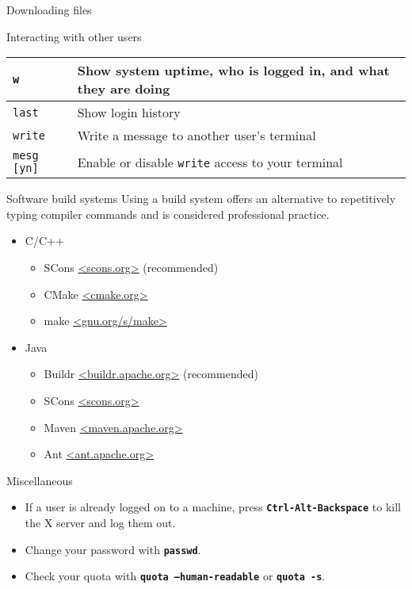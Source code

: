 \documentclass{beamer}
\newcommand{\command}[1]{\textbf{\texttt{#1}}}
\begin{document}
\begin{frame}[fragile]{}
\begin{columns}[T]
\begin{column}{0.33\textwidth}
\begin{block}{Downloading files}
      \end{block}
      \begin{block}{Interacting with other users}
        \begin{tabu} to 0.9\linewidth { X X }
          \texttt{w} & Show system uptime, who is logged in, and what they are doing \\ \hline
          \texttt{last} & Show login history \\ \hline
          \texttt{write} & Write a message to another user's terminal \\ \hline
          \texttt{mesg [yn]} & Enable or disable \texttt{write} access to your terminal
        \end{tabu}
      \end{block}
            \begin{block}{Software build systems}
        Using a build system offers an alternative to repetitively typing compiler commands and is considered professional practice.
        \begin{itemize}
        \item C/C++
          \begin{itemize}
          \item SCons \url{<scons.org>} (recommended)
          \item CMake \url{<cmake.org>}
          \item make \url{<gnu.org/s/make>}
          \end{itemize}
        \item Java
          \begin{itemize}
          \item Buildr \url{<buildr.apache.org>} (recommended)
          \item SCons \url{<scons.org>}
          \item Maven \url{<maven.apache.org>}
          \item Ant \url{<ant.apache.org>}
          \end{itemize}
        \end{itemize}
      \end{block}
      \begin{block}{Miscellaneous}
        \begin{itemize}
        \item If a user is already logged on to a machine, press \command{Ctrl-Alt-Backspace} to kill the X server and log them out.
        \item Change your password with \command{passwd}.
        \item Check your quota with \command{quota --human-readable} or \command{quota -s}.
        \end{itemize}
      \end{block}
    \end{column}
  \end{columns}
\end{frame}
\end{document}
